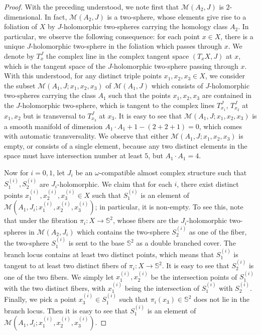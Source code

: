 \documentclass[11pt]{amsart}
\theoremstyle{plain}
\numberwithin{theorem}{section}
\theoremstyle{definition}
\newcommand{\s}{{\mathbb S}}
\newcommand{\M}{{\mathcal M}}
\begin{document}
\begin{proof}
With the preceding understood, we note first that $\M(A_2,J)$ is $2$-dimensional. In fact, $\M(A_2,J)$ is a two-sphere, whose elements give rise to a foliation of $X$ by $J$-holomorphic two-spheres carrying the homology class $A_2$. In particular, we observe the following consequence: for each point $x\in X$, there is a unique $J$-holomorphic two-sphere in the foliation which passes through $x$. We denote by $T_x^J$ the complex line in the complex tangent space $(T_x X,J)$ at $x$, which is the tangent space of the $J$-holomorphic two-sphere passing through $x$. With this understood, for any distinct triple points $x_1,x_2,x_3\in X$, we consider the subset 
$\M(A_1,J; x_1,x_2,x_3)$ of $\M(A_1,J)$ which consists of $J$-holomorphic two-spheres carrying the class $A_1$ such that the points $x_1,x_2,x_3$ are contained in the $J$-holomorphic two-sphere, which is tangent to the complex lines  $T_{x_1}^J$, $T_{x_2}^J$ at $x_1,x_2$ but is transversal to $T_{x_3}^J$ at $x_3$. It is easy to see that $\M(A_1,J; x_1,x_2,x_3)$ is a smooth manifold of dimension $A_1\cdot A_1+1-(2+2+1)=0$, which comes with automatic transversality. We observe that either $\M(A_1,J; x_1,x_2,x_3)$ is empty, or consists of a single element, because any two distinct elements in the space must have intersection number at least $5$, but $A_1\cdot A_1=4$. 

Now for $i=0,1$, let $J_i$ be an $\omega$-compatible almost complex structure such that $S_1^{(i)},S_2^{(i)}$ are
$J_i$-holomorphic. We claim that for each $i$, there exist distinct points $x_1^{(i)},x_2^{(i)},x_3^{(i)}\in X$
such that $S_1^{(i)}$ is an element of $\M(A_1,J_i; x_1^{(i)},x_2^{(i)},x_3^{(i)})$; in particular, it is non-empty. 
To see this, note that under the fibration $\pi_i: X\rightarrow \s^2$, whose fibers are the $J_i$-holomorphic 
two-spheres in $\M(A_2,J_i)$ which contains the two-sphere $S_2^{(i)}$ as one of the fiber, the two-sphere
 $S_1^{(i)}$ is sent to the base $\s^2$ as a double branched cover. The branch locus contains at least two distinct
 points, which means that $S_1^{(i)}$ is tangent to at least two distinct fibers of $\pi_i: X\rightarrow \s^2$. It is easy to see that $S_2^{(i)}$ is one of the two fibers. We simply let $x_1^{(i)},x_2^{(i)}$ be the intersection points of 
 $S_1^{(i)}$ with the two distinct fibers, with $x_1^{(i)}$ being the intersection of  $S_1^{(i)}$ with $S_2^{(i)}$. Finally, we pick a point $x_3^{(i)}\in S_1^{(i)}$ such that $\pi_i(x_3)\in \s^2$ does not lie in the branch locus. Then it is easy to see that $S_1^{(i)}$ is an element of $\M(A_1,J_i; x_1^{(i)},x_2^{(i)},x_3^{(i)})$. 
 

\end{proof}
\end{document}

